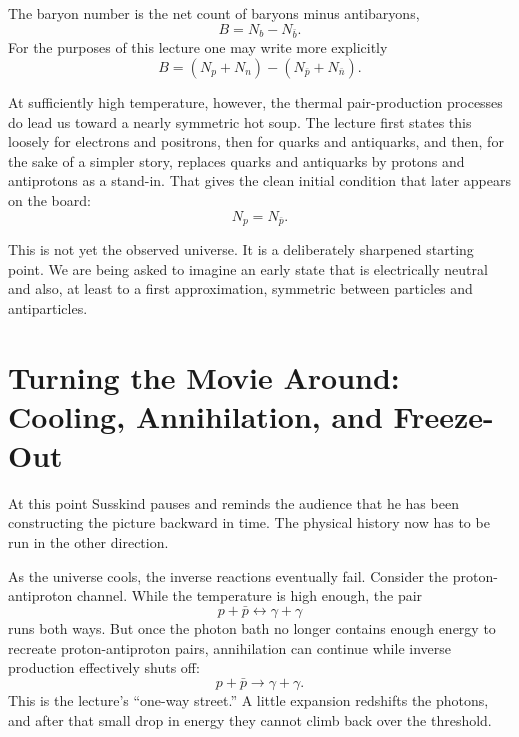 \begin{definition}
The baryon number is the net count of baryons minus antibaryons,
\begin{equation}
B = N_b - N_{\bar b}.
\end{equation}
For the purposes of this lecture one may write more explicitly
\begin{equation}
B = (N_p+N_n) - (N_{\bar p}+N_{\bar n}).
\end{equation}
\end{definition}

At sufficiently high temperature, however, the thermal pair-production processes do lead us toward a nearly symmetric hot soup. The lecture first states this loosely for electrons and positrons, then for quarks and antiquarks, and then, for the sake of a simpler story, replaces quarks and antiquarks by protons and antiprotons as a stand-in. That gives the clean initial condition that later appears on the board:
\begin{equation}
N_p = N_{\bar p}.
\end{equation}

This is not yet the observed universe. It is a deliberately sharpened starting point. We are being asked to imagine an early state that is electrically neutral and also, at least to a first approximation, symmetric between particles and antiparticles.

\section{Turning the Movie Around: Cooling, Annihilation, and Freeze-Out}

At this point Susskind pauses and reminds the audience that he has been constructing the picture backward in time. The physical history now has to be run in the other direction.

As the universe cools, the inverse reactions eventually fail. Consider the proton-antiproton channel. While the temperature is high enough, the pair
\begin{equation}
p+\bar p \leftrightarrow \gamma+\gamma
\end{equation}
runs both ways. But once the photon bath no longer contains enough energy to recreate proton-antiproton pairs, annihilation can continue while inverse production effectively shuts off:
\begin{equation}
p+\bar p \to \gamma+\gamma.
\end{equation}
This is the lecture's ``one-way street.'' A little expansion redshifts the photons, and after that small drop in energy they cannot climb back over the threshold.

